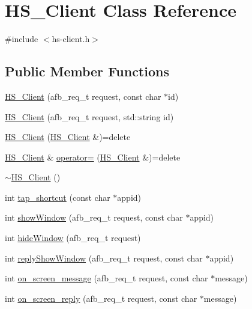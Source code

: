 \hypertarget{class_h_s___client}{}\section{H\+S\+\_\+\+Client Class Reference}
\label{class_h_s___client}


{\ttfamily \#include $<$hs-\/client.\+h$>$}

\subsection*{Public Member Functions}
\begin{DoxyCompactItemize}
\item 
\hyperlink{class_h_s___client_a0afac6b86b9a72e74846e47e435f5f90}{H\+S\+\_\+\+Client} (afb\+\_\+req\+\_\+t request, const char $\ast$id)
\item 
\hyperlink{class_h_s___client_a47cb0035116ac7be4fffcfc9736e9233}{H\+S\+\_\+\+Client} (afb\+\_\+req\+\_\+t request, std\+::string id)
\item 
\hyperlink{class_h_s___client_a429a4697767344f3789bb233bc73a2b9}{H\+S\+\_\+\+Client} (\hyperlink{class_h_s___client}{H\+S\+\_\+\+Client} \&)=delete
\item 
\hyperlink{class_h_s___client}{H\+S\+\_\+\+Client} \& \hyperlink{class_h_s___client_a3e3d8fa1c8746d6d1b1650fe1fcc56a8}{operator=} (\hyperlink{class_h_s___client}{H\+S\+\_\+\+Client} \&)=delete
\item 
\hyperlink{class_h_s___client_ab29a9e899aaec3c21983c24ec6e5ee70}{$\sim$\+H\+S\+\_\+\+Client} ()
\item 
int \hyperlink{class_h_s___client_a0d7fb8316248e8946dcb73a6612f21bb}{tap\+\_\+shortcut} (const char $\ast$appid)
\item 
int \hyperlink{class_h_s___client_af0f2be967a5b6ee81932c73b101184f7}{show\+Window} (afb\+\_\+req\+\_\+t request, const char $\ast$appid)
\item 
int \hyperlink{class_h_s___client_ac29482ffdf1b27733247ba0ffcc28b76}{hide\+Window} (afb\+\_\+req\+\_\+t request)
\item 
int \hyperlink{class_h_s___client_a294e461500ef02aed17ed5d91479f6b9}{reply\+Show\+Window} (afb\+\_\+req\+\_\+t request, const char $\ast$appid)
\item 
int \hyperlink{class_h_s___client_a274301617c9ab629d6916c0dde8c40b9}{on\+\_\+screen\+\_\+message} (afb\+\_\+req\+\_\+t request, const char $\ast$message)
\item 
int \hyperlink{class_h_s___client_a9f7a30840c95b1348bcce4cd4626b2ae}{on\+\_\+screen\+\_\+reply} (afb\+\_\+req\+\_\+t request, const char $\ast$message)

\end{DoxyCompactItemize}
